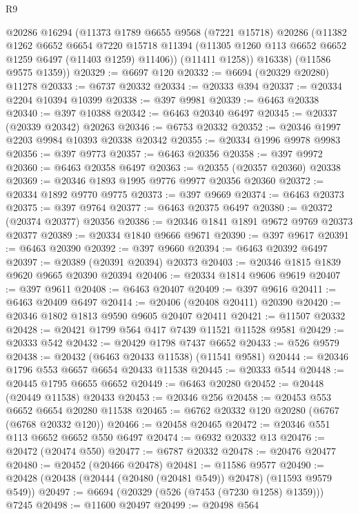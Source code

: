 \begin{lexlean}{R9}
\begin{coremodule}
        @20286
        @16294
        (@11373
          @1789
          @6655
          @9568
          (@7221 @15718)
          @20286
          (@11382
            @1262
            @6652
            @6654
            @7220
            @15718
            @11394
            (@11305 @1260 @113 @6652 @6652 @1259 @6497 (@11403 @1259) @11406))
          (@11411 @1258))
        @16338)
      (@11586 @9575 @1359))
@20329 := @6697 @120
@20332 := @6694 (@20329 @20280) @11278
@20333 := @6737 @20332
@20334 := @20333 @394
@20337 := @20334 @2204 @10394 @10399
@20338 := @397 @9981
@20339 := @6463 @20338
@20340 := @397 @10388
@20342 := @6463 @20340 @6497
@20345 := @20337 (@20339 @20342) @20263
@20346 := @6753 @20332
@20352 := @20346 @1997 @2203 @9984 @10393 @20338 @20342
@20355 := @20334 @1996 @9978 @9983
@20356 := @397 @9773
@20357 := @6463 @20356
@20358 := @397 @9972
@20360 := @6463 @20358 @6497
@20363 := @20355 (@20357 @20360) @20338
@20369 := @20346 @1893 @1995 @9776 @9977 @20356 @20360
@20372 := @20334 @1892 @9770 @9775
@20373 := @397 @9669
@20374 := @6463 @20373
@20375 := @397 @9764
@20377 := @6463 @20375 @6497
@20380 := @20372 (@20374 @20377) @20356
@20386 := @20346 @1841 @1891 @9672 @9769 @20373 @20377
@20389 := @20334 @1840 @9666 @9671
@20390 := @397 @9617
@20391 := @6463 @20390
@20392 := @397 @9660
@20394 := @6463 @20392 @6497
@20397 := @20389 (@20391 @20394) @20373
@20403 := @20346 @1815 @1839 @9620 @9665 @20390 @20394
@20406 := @20334 @1814 @9606 @9619
@20407 := @397 @9611
@20408 := @6463 @20407
@20409 := @397 @9616
@20411 := @6463 @20409 @6497
@20414 := @20406 (@20408 @20411) @20390
@20420 := @20346 @1802 @1813 @9590 @9605 @20407 @20411
@20421 := @11507 @20332
@20428 := @20421 @1799 @564 @417 @7439 @11521 @11528 @9581
@20429 := @20333 @542
@20432 := @20429 @1798 @7437 @6652
@20433 := @526 @9579
@20438 := @20432 (@6463 @20433 @11538) (@11541 @9581)
@20444 := @20346 @1796 @553 @6657 @6654 @20433 @11538
@20445 := @20333 @544
@20448 := @20445 @1795 @6655 @6652
@20449 := @6463 @20280
@20452 := @20448 (@20449 @11538) @20433
@20453 := @20346 @256
@20458 := @20453 @553 @6652 @6654 @20280 @11538
@20465 := @6762 @20332 @120 @20280 (@6767 (@6768 @20332 @120))
@20466 := @20458 @20465
@20472 := @20346 @551 @113 @6652 @6652 @550 @6497
@20474 := @6932 @20332 @13
@20476 := @20472 (@20474 @550)
@20477 := @6787 @20332
@20478 := @20476 @20477
@20480 := @20452 (@20466 @20478)
@20481 := @11586 @9577
@20490 := @20428 (@20438 (@20444 (@20480 (@20481 @549)) @20478) (@11593 @9579 @549))
@20497 := @6694 (@20329 (@526 (@7453 (@7230 @1258) @1359))) @7245
@20498 := @11600 @20497
@20499 := @20498 @564

\end{coremodule}
\end{lexlean}
